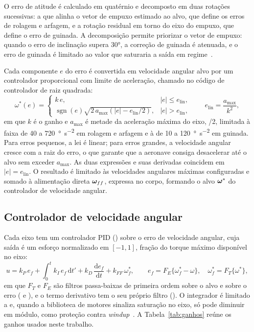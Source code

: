 O erro de atitude é calculado em quatérnio e decomposto em duas rotações
sucessivas: a que alinha o vetor de empuxo estimado ao alvo, que define os
erros de rolagem e arfagem, e a rotação residual em torno do eixo do empuxo,
que define o erro de guinada. A decomposição permite priorizar o vetor de
empuxo: quando o erro de inclinação supera \ang{30}, a correção de guinada é
atenuada, e o erro de guinada é limitado ao valor que saturaria a saída em
regime~\cite{ardupilot2026}.

Cada componente $e$ do erro é convertida em velocidade angular alvo por um
controlador proporcional com limite de aceleração, chamado no código de
controlador de raiz quadrada:
\begin{equation}
\omega^*(e) =
\begin{cases}
k\,e, & |e| \le e_{\mathrm{lin}}, \\[2pt]
\operatorname{sgn}(e)\sqrt{2\,a_{\max}\left(|e| - e_{\mathrm{lin}}/2\right)},
   & |e| > e_{\mathrm{lin}},
\end{cases}
\qquad e_{\mathrm{lin}} = \frac{a_{\max}}{k^2},
\label{eq:sqrt-controller}
\end{equation}
em que $k$ é o ganho  e $a_{\max}$ é metade da
aceleração máxima do eixo, /2, limitada à faixa de
40 a \SI{720}{\degree\per\second\squared} em rolagem e arfagem e à de 10 a
\SI{120}{\degree\per\second\squared} em guinada. Para erros pequenos, a lei é linear; para erros
grandes, a velocidade angular cresce com a raiz do erro, o que garante que a
aeronave consiga desacelerar até o alvo sem exceder $a_{\max}$. As duas
expressões e suas derivadas coincidem em $|e| = e_{\mathrm{lin}}$. O resultado
é limitado às velocidades angulares máximas configuradas e somado à
alimentação direta $\bm{\omega}_{ff}$, expressa no corpo, formando o alvo
$\bm{\omega}^*$ do controlador de velocidade angular.

\subsection{Controlador de velocidade angular}

Cada eixo tem um controlador PID () sobre o erro de
velocidade angular, cuja saída é um esforço normalizado em $[-1, 1]$, fração
do torque máximo disponível no eixo:
\begin{equation}
u = k_P\,e_f + \int_0^t k_I\,e_f\,\mathrm{d}t' + k_D\,\frac{\mathrm{d}e_f}{\mathrm{d}t}
    + k_{FF}\,\omega^*_f,
\qquad e_f = F_E\{\omega^*_f - \omega\},\quad \omega^*_f = F_T\{\omega^*\},
\label{eq:pid-taxa}
\end{equation}
em que $F_T$ e $F_E$ são filtros passa-baixas de primeira ordem sobre o alvo e
sobre o erro ( e ), e o termo derivativo tem o seu
próprio filtro (). O integrador é limitado a  e,
quando a biblioteca de motores sinaliza saturação no eixo, só pode diminuir
em módulo, como proteção contra \textit{windup}~\cite[Cap.~10]{astrom2008}. A Tabela~\ref{tab:ganhos}
reúne os ganhos usados neste trabalho.

